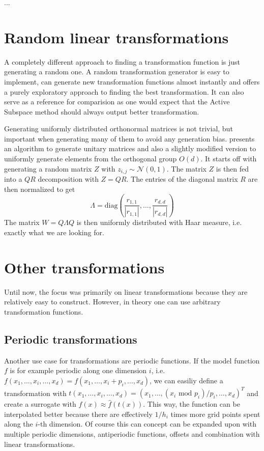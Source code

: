 \documentclass[
  a4paper,  %
  twoside,  %
  bibliography=totoc,
  headsepline,
  cleardoublepage=empty,
  parskip=half,
  draft=false
]{scrbook}
\begin{document}
...

\section{Random linear transformations}

A completely different approach to finding a transformation function is just generating a random one.
A random transformation generator is easy to implement, can generate new transformation functions almost instantly and offers a purely exploratory approach to finding the best transformation.
It can also serve as a reference for comparision as one would expect that the Active Subspace method should always output better transformation.

Generating uniformly distributed orthonormal matrices is not trivial, but important when generating many of them to avoid any generation bias.
\cite{ABC} presents an algorithm to generate unitary matrices and also a slightly modified version to uniformly generate elements from the orthogonal group $O(d)$.
It starts off with generating a random matrix $Z$ with $z_{i,j} \sim \mathcal{N}\left(0, 1\right)$.
The matrix $Z$ is then fed into a $QR$ decomposition with $Z=QR$.
The entries of the diagonal matrix $R$ are then normalized to get
\begin{equation}
\Lambda=\text{diag}\left(\frac{r_{1,1}}{|r_{1,1}|}, \dots, \frac{r_{d,d}}{|r_{d,d}|}\right)
\end{equation}
The matrix $W=Q \Lambda Q$ is then uniformly distributed with Haar measure, i.e. exactly what we are looking for.


\section{Other transformations}

Until now, the focus was primarily on linear transformations because they are relatively easy to construct.
However, in theory one can use arbitrary transformation functions.

\subsection{Periodic transformations}

Another use case for transformations are periodic functions.
If the model function $f$ is for example periodic along one dimension $i$, i.e. $f(x_1,\dots,x_i,\dots,x_d)=f(x_1,\dots,x_i + p_i, \dots,x_d)$, we can easiliy define a transformation with $t(x_1,\dots,x_i,\dots,x_d)=(x_1,\dots,(x_i\text{ mod } p_i) /p_i, \dots,x_d)^T$ and create a surrogate with $f(x) \approx \hat{f}(t(x))$.
This way, the function can be interpolated better because there are effectively $1 / h_i$ times more grid points spent along the $i$-th dimension.
Of course this can concept can be expanded upon with multiple periodic dimensions, antiperiodic functions, offsets and combination with linear transformations.
\end{document}
